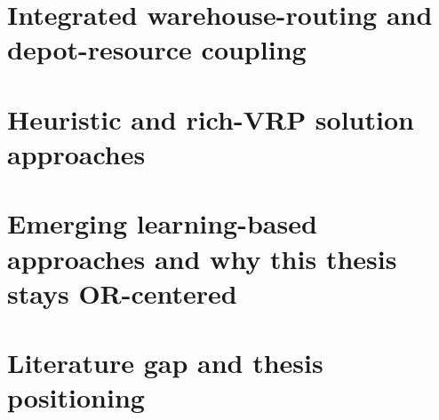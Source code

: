 \section{Integrated warehouse-routing and depot-resource coupling}
%
%

\section{Heuristic and rich-VRP solution approaches}
%
%

\section{Emerging learning-based approaches and why this thesis stays OR-centered}
%

\section{Literature gap and thesis positioning}
%
